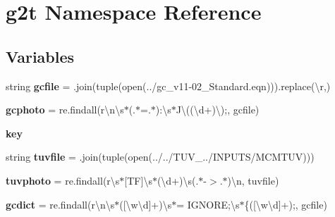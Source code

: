 \hypertarget{namespaceg2t}{}\section{g2t Namespace Reference}
\label{namespaceg2t}
\subsection*{Variables}
\begin{DoxyCompactItemize}
\item 
\mbox{\label{namespaceg2t_aa26171548eb8c80d98aab7970b7fd500}} 
string {\bfseries gcfile} = \textquotesingle{} \textquotesingle{}.join(tuple(open(\textquotesingle{}../gc\+\_\+v11-\/02\+\_\+\+Standard.\+eqn\textquotesingle{}))).\+replace(\textquotesingle{}\textbackslash{}r\textquotesingle{},\textquotesingle{}\textquotesingle{})
\item 
\mbox{\label{namespaceg2t_ae2064d787ab1dca5004a5b5fd4eed98b}} 
{\bfseries gcphoto} = re.\+findall(r\textquotesingle{}\textbackslash{}n\textbackslash{}s$\ast$(.$\ast$=.$\ast$)\+:\textbackslash{}s$\ast$J\textbackslash{}((\textbackslash{}d+)\textbackslash{});\textquotesingle{}, gcfile)
\item 
\mbox{\label{namespaceg2t_a49d9c0cc8cd56f49ab6de8a4e3e9320d}} 
{\bfseries key}
\item 
\mbox{\label{namespaceg2t_acba3d7ba8b869c60b34c2beffa7435df}} 
string {\bfseries tuvfile} = \textquotesingle{} \textquotesingle{}.join(tuple(open(\textquotesingle{}../../T\+U\+V\+\_../I\+N\+P\+U\+TS/M\+C\+M\+T\+UV\textquotesingle{})))
\item 
\mbox{\label{namespaceg2t_a38ae2a546fa7cc3263f5647f467b4c9e}} 
{\bfseries tuvphoto} = re.\+findall(r\textquotesingle{}\textbackslash{}s$\ast$\mbox{[}TF\mbox{]}\textbackslash{}s$\ast$(\textbackslash{}d+)\textbackslash{}s(.$\ast$-\/$>$.$\ast$)\textbackslash{}n\textquotesingle{}, tuvfile)
\item 
\mbox{\label{namespaceg2t_ab23ef6188efdb630c1e426db9450f7ac}} 
{\bfseries gcdict} = re.\+findall(r\textquotesingle{}\textbackslash{}n\textbackslash{}s$\ast$(\mbox{[}\textbackslash{}w\textbackslash{}d\mbox{]}+)\textbackslash{}s$\ast$= I\+G\+N\+O\+RE;\textbackslash{}s$\ast$\{(\mbox{[}\textbackslash{}w\textbackslash{}d\mbox{]}+);\textquotesingle{}, gcfile)

\end{DoxyCompactItemize}
